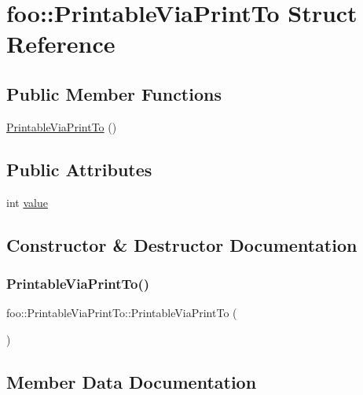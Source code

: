 \hypertarget{structfoo_1_1PrintableViaPrintTo}{}\section{foo\+::Printable\+Via\+Print\+To Struct Reference}
\label{structfoo_1_1PrintableViaPrintTo}
\subsection*{Public Member Functions}
\begin{DoxyCompactItemize}
\item 
\mbox{\hyperlink{structfoo_1_1PrintableViaPrintTo_aa0b30386f09ac39f88e3b54a9397ea01}{Printable\+Via\+Print\+To}} ()
\end{DoxyCompactItemize}
\subsection*{Public Attributes}
\begin{DoxyCompactItemize}
\item 
int \mbox{\hyperlink{structfoo_1_1PrintableViaPrintTo_a16f8c6420275d86f0d0112ca5a41bca2}{value}}
\end{DoxyCompactItemize}


\subsection{Constructor \& Destructor Documentation}
\mbox{\label{structfoo_1_1PrintableViaPrintTo_aa0b30386f09ac39f88e3b54a9397ea01}} 
\subsubsection{\texorpdfstring{PrintableViaPrintTo()}{PrintableViaPrintTo()}}
{\footnotesize\ttfamily foo\+::\+Printable\+Via\+Print\+To\+::\+Printable\+Via\+Print\+To (\begin{DoxyParamCaption}{ }\end{DoxyParamCaption})\hspace{0.3cm}{\ttfamily [inline]}}



\subsection{Member Data Documentation}
\mbox{\label{structfoo_1_1PrintableViaPrintTo_a16f8c6420275d86f0d0112ca5a41bca2}} 
